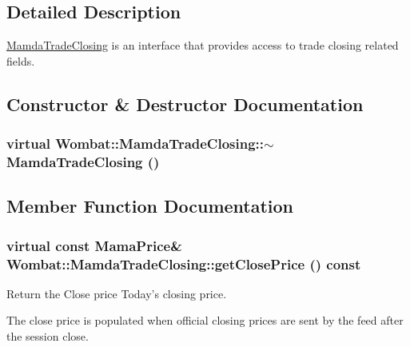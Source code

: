 \subsection{Detailed Description}
\hyperlink{classWombat_1_1MamdaTradeClosing}{Mamda\-Trade\-Closing} is an interface that provides access to trade closing related fields. 



\subsection{Constructor \& Destructor Documentation}
\hypertarget{classWombat_1_1MamdaTradeClosing_d0a208ac96899d1a94702514970df9d3}{
\subsubsection[$\sim$MamdaTradeClosing]{\setlength{\rightskip}{0pt plus 5cm}virtual Wombat::Mamda\-Trade\-Closing::$\sim$Mamda\-Trade\-Closing ()}}
\label{classWombat_1_1MamdaTradeClosing_d0a208ac96899d1a94702514970df9d3}




\subsection{Member Function Documentation}
\hypertarget{classWombat_1_1MamdaTradeClosing_74d8721012d6e43cc9066191355aaec6}{
\subsubsection[getClosePrice]{\setlength{\rightskip}{0pt plus 5cm}virtual const Mama\-Price\& Wombat::Mamda\-Trade\-Closing::get\-Close\-Price () const}}
\label{classWombat_1_1MamdaTradeClosing_74d8721012d6e43cc9066191355aaec6}


Return the Close price Today's closing price. 

The close price is populated when official closing prices are sent by the feed after the session close.


